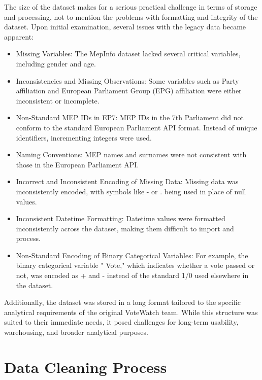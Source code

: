 \documentclass{report}
\begin{document}
    The size of the dataset makes for a serious practical challenge in terms of storage and processing, not to
    mention the problems with formatting and integrity of the dataset. Upon initial examination, several issues
    with the
    legacy data became apparent:

    \begin{itemize}
        \item
        Missing Variables: The MepInfo dataset lacked several critical variables, including gender and age.
        \item
        Inconsistencies and Missing Observations: Some variables such as Party affiliation and European
        Parliament Group
        (EPG) affiliation were either inconsistent or incomplete.
        \item
        Non-Standard MEP IDs in EP7: MEP IDs in the 7th Parliament did not conform to the standard European
        Parliament
        API format. Instead of unique identifiers, incrementing integers were used.
        \item
        Naming Conventions: MEP names and surnames were not consistent with those in the European
        Parliament API.
        \item
        Incorrect and Inconsistent Encoding of Missing Data: Missing data was inconsistently encoded, with
        symbols like
        - or . being used in place of null values.
        \item
        Inconsistent Datetime Formatting: Datetime values were formatted inconsistently across the dataset,
        making them
        difficult to import and process.
        \item
        Non-Standard Encoding of Binary Categorical Variables: For example, the binary categorical variable "
        Vote,"
        which indicates whether a vote passed or not, was encoded as + and - instead of the standard 1/0 used
        elsewhere
        in the dataset.
    \end{itemize}
    Additionally, the dataset was stored in a long format tailored to the specific analytical requirements of
    the
    original VoteWatch team. While this structure was suited to their immediate needs, it posed challenges for
    long-term
    usability, warehousing, and broader analytical purposes.


    \chapter{Data Cleaning Process}
\end{document}
